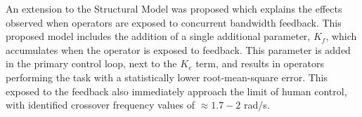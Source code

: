 An extension to the Structural Model was proposed which explains the effects observed when operators are exposed to concurrent bandwidth feedback.
This proposed model includes the addition of a single additional parameter, $K_f$, which accumulates when the operator is exposed to feedback.
This parameter is added in the primary control loop, next to the $K_e$ term, and results in operators performing the task with a statistically lower root-mean-square error.
This exposed to the feedback also immediately approach the limit of human control, with identified crossover frequency values of $\approx 1.7-2$ rad/s.
